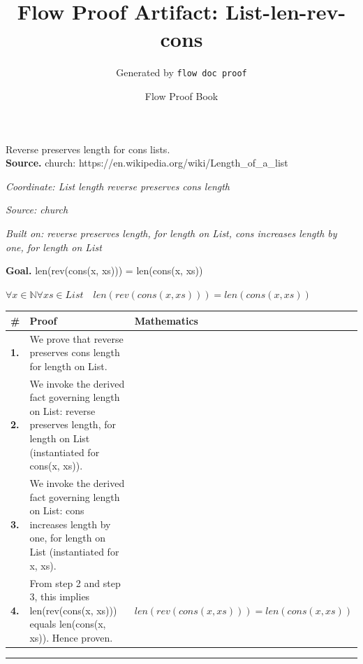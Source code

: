\documentclass[11pt]{article}
\title{Flow Proof Artifact: List-len-rev-cons}
\author{Generated by \texttt{flow doc proof}}
\date{Flow Proof Book}
\theoremstyle{definition}
\begin{document}
\maketitle
Reverse preserves length for cons lists.\\[0.5em]
\textbf{Source.} church: https://en.wikipedia.org/wiki/Length\_of\_a\_list\\[0.5em]
\bigskip
{}\par
\smallskip\noindent\textit{Coordinate: List \cdot length \cdot reverse preserves cons length}\par
\smallskip\noindent\textit{Source: church}\par
\smallskip\noindent\textit{Built on: reverse preserves length, for length on List, cons increases length by one, for length on List}\par
\medskip
\noindent\textbf{Goal.} len(rev(cons(x, xs))) = len(cons(x, xs))\par
\noindent$\displaystyle \forall x \in \mathbb{N} \forall xs \in List\quad len(rev(cons(x, xs))) = len(cons(x, xs))$\par
\medskip
\noindent
\begin{tabular}{@{} >{\raggedright\arraybackslash}p{} >{\raggedright\arraybackslash}p{} >{\raggedleft\arraybackslash}p{} @{}}
\textbf{\#} & \textbf{Proof} & \textbf{Mathematics} \\
\midrule
\textbf{1.} & We prove that reverse preserves cons length for length on List. & \\[0.45em]
\textbf{2.} & We invoke the derived fact governing length on List: reverse preserves length, for length on List (instantiated for cons(x, xs)). & \\[0.45em]
\textbf{3.} & We invoke the derived fact governing length on List: cons increases length by one, for length on List (instantiated for x, xs). & \\[0.45em]
\textbf{4.} & From step 2 and step 3, this implies len(rev(cons(x, xs))) equals len(cons(x, xs)). Hence proven. & $\displaystyle len(rev(cons(x, xs))) = len(cons(x, xs))$ \\[0.45em]
\bottomrule
\end{tabular}
\label{thm:List-length-reverse_preserves_cons_length}
\par\medskip\hrule
\end{document}
